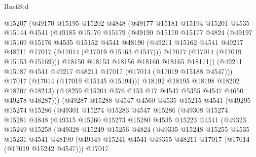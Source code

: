 \begin{lexlean}{RustStd}
\begin{coremodule}
              @15207
              (@49170
                @15195
                @15202
                @4848
                (@49177
                  @15181
                  @15194
                  @15201
                  @4535
                  @15144
                  @4541
                  (@49185
                    @15170
                    @15179
                    (@49190
                      @15170
                      @15177
                      @4824
                      (@49197
                        @15169
                        @15176
                        @4535
                        @15152
                        @4541
                        @48190
                        (@49211 @15162 @4541 @49217 @48211 @17017 (@17014 (@17019 @15163 @4547)))
                        @17017
                        (@17014 (@17019 @15153 @15169)))
                      @18150
                      @18153
                      @18156
                      @18160
                      @18165
                      @18171))
                  (@49211 @15187 @4541 @49217 @48211 @17017 (@17014 (@17019 @15188 @4547)))
                  @17017
                  (@17014 (@17019 @15145 @15194)))
                @18192
                @18195
                @18198
                @18202
                @18207
                @18213)
              (@48259 @15204 @376 @153 @17 @4547 @5355 @4547 @4650 @49278 @48287)))
          (@49287
            @15288
            @4547
            @4560
            @4535
            @15215
            @4541
            (@49295
              @15274
              @15286
              (@49301
                @15274
                @15283
                @4547
                @15286
                (@49308
                  @15274
                  @15281
                  @4848
                  (@49315
                    @15260
                    @15273
                    @15280
                    @4535
                    @15223
                    @4541
                    (@49323
                      @15249
                      @15258
                      (@49328
                        @15249
                        @15256
                        @4824
                        (@49335
                          @15248
                          @15255
                          @4535
                          @15231
                          @4541
                          @48190
                          (@49349 @15241 @4541 @49355 @48211 @17017 (@17014 (@17019 @15242 @4547)))
                          @17017

\end{coremodule}
\end{lexlean}
